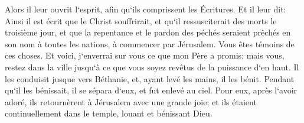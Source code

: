 \verse Alors il leur ouvrit l`esprit, afin qu`ils comprissent les Écritures. 
\verse Et il leur dit: Ainsi il est écrit que le Christ souffrirait, et qu`il ressusciterait des morts le troisième jour, 
\verse et que la repentance et le pardon des péchés seraient prêchés en son nom à toutes les nations, à commencer par Jérusalem. 
\verse Vous êtes témoins de ces choses. 
\verse Et voici, j`enverrai sur vous ce que mon Père a promis; mais vous, restez dans la ville jusqu`à ce que vous soyez revêtus de la puissance d`en haut. 
\verse Il les conduisit jusque vers Béthanie, et, ayant levé les mains, il les bénit. 
\verse Pendant qu`il les bénissait, il se sépara d`eux, et fut enlevé au ciel. 
\verse Pour eux, après l`avoir adoré, ils retournèrent à Jérusalem avec une grande joie; 
\verse et ils étaient continuellement dans le temple, louant et bénissant Dieu. 
